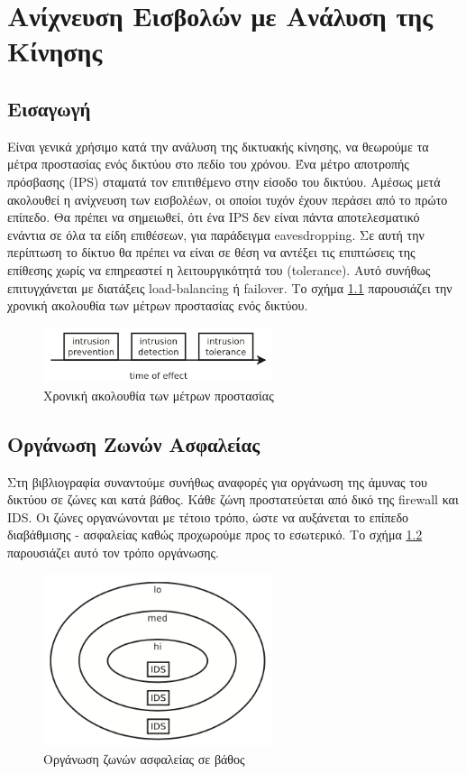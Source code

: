 \documentclass[12pt]{report}
\begin{document}
\chapter{Ανίχνευση Εισβολών με Ανάλυση της Κίνησης}
\section{Εισαγωγή}
Είναι γενικά χρήσιμο κατά την ανάλυση της δικτυακής κίνησης, να θεωρούμε τα μέτρα προστασίας ενός δικτύου στο πεδίο του χρόνου. Ένα μέτρο αποτροπής πρόσβασης (\textlatin{IPS}) σταματά τον επιτιθέμενο στην είσοδο του δικτύου. Αμέσως μετά ακολουθεί η ανίχνευση των εισβολέων, οι οποίοι τυχόν έχουν περάσει από το πρώτο επίπεδο. Θα πρέπει να σημειωθεί, ότι ένα \textlatin{IPS} δεν είναι πάντα αποτελεσματικό ενάντια σε όλα τα είδη επιθέσεων, για παράδειγμα \textlatin{eavesdropping}. Σε αυτή την περίπτωση το δίκτυο θα πρέπει να είναι σε θέση να αντέξει τις επιπτώσεις της επίθεσης χωρίς να επηρεαστεί η λειτουργικότητά του (\textlatin{tolerance}). Αυτό συνήθως επιτυγχάνεται με διατάξεις \textlatin{load-balancing} ή \textlatin{failover}. Το σχήμα \ref{fig:sec-path} παρουσιάζει την χρονική ακολουθία των μέτρων προστασίας ενός δικτύου.
\begin{figure}[ht]
\centering
\includegraphics[width=0.6\textwidth]{sec-path}
\caption{Χρονική ακολουθία των μέτρων προστασίας}
\label{fig:sec-path}
\end{figure}

\section{Οργάνωση Ζωνών Ασφαλείας}
Στη βιβλιογραφία συναντούμε συνήθως αναφορές για οργάνωση της άμυνας του δικτύου σε ζώνες και κατά βάθος. Κάθε ζώνη προστατεύεται από δικό της \textlatin{firewall} και \textlatin{IDS}. Οι ζώνες οργανώνονται με τέτοιο τρόπο, ώστε να αυξάνεται το επίπεδο διαβάθμισης - ασφαλείας καθώς προχωρούμε προς το εσωτερικό. Το σχήμα \ref{fig:def-in-depth} παρουσιάζει αυτό τον τρόπο οργάνωσης.
\begin{figure}[ht]
\centering
\includegraphics[width=0.6\textwidth]{def-in-depth}
\caption{Οργάνωση ζωνών ασφαλείας σε βάθος}
\label{fig:def-in-depth}
\end{figure}
\end{document}
